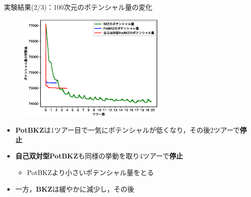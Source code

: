 \documentclass[12pt,aspectratio=169,xcolor=dvipsnames,table,dvipdfmx, leqno]{beamer}
\begin{document}
\begin{frame}{実験結果(2/3)：100次元のポテンシャル量の変化}
\begin{figure}[t]
\includegraphics[height = 150pt]{100_compare_potential.eps}
\end{figure}
\begin{itemize}
    \footnotesize
    \item \textbf{PotBKZ}は1ツアー目で一気にポテンシャルが低くなり，その後\alert{2ツアーで\textbf{停止}}
    \item \textbf{自己双対型PotBKZ}も同様の挙動を取り\alert{4ツアーで\textbf{停止}}
    \begin{itemize}
        \item PotBKZより\alert{小さいポテンシャル量をとる}
    \end{itemize}
    \item 一方，\textbf{BKZ}\cite{SE94}は緩やかに減少し，その後
\end{itemize}
\end{frame}
\end{document}
